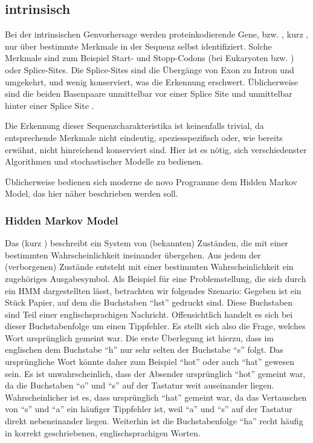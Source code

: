 \subsection{intrinsisch}
Bei der intrinsischen Genvorhersage werden proteinkodierende Gene, bzw.
, kurz , nur über bestimmte Merkmale in
der Sequenz selbst identifiziert.
Solche Merkmale sind zum Beispiel Start- und Stopp-Codons (bei
Eukaryoten  bzw. ) oder Splice-Sites.
Die Splice-Sites sind die Übergänge von Exon zu Intron und umgekehrt, und wenig
konserviert, was die Erkennung erschwert.
Üblicherweise sind die beiden Basenpaare unmittelbar vor einer
Splice Site  und unmittelbar hinter einer Splice Site .

Die Erkennung dieser Sequenzcharakteristika ist keinenfalls trivial, da entsprechende
Merkmale nicht eindeutig, speziesspezifisch oder, wie bereits erwähnt, nicht
hinreichend konserviert sind.
Hier ist es nötig, sich verschiedenster Algorithmen und stochastischer
Modelle zu bedienen.

Üblicherweise bedienen sich moderne de novo  Programme dem Hidden
Markov Model, das hier näher beschrieben werden soll.

\subsubsection{Hidden Markov Model}
Das  (kurz )
beschreibt ein System von (bekannten) Zuständen, die mit einer bestimmten
Wahrscheinlichkeit ineinander übergehen.
Aus jedem der (verborgenen) Zustände entsteht mit einer
bestimmten Wahrscheinlichkeit ein zugehöriges Ausgabesymbol.
Als Beispiel für eine Problemstellung, die sich durch ein HMM dargestellten
lässt, betrachten wir folgendes Szenario:
Gegeben ist ein Stück Papier, auf dem die Buchstaben \enquote{hst}
gedruckt sind.
Diese Buchstaben sind Teil einer englischsprachigen Nachricht.
Offensichtlich handelt es sich bei dieser Buchstabenfolge um einen Tippfehler.
Es stellt sich also die Frage, welches Wort ursprünglich gemeint war.
Die erste Überlegung ist hierzu, dass im englischen dem Buchstabe \enquote{h}
nur sehr selten der Buchstabe \enquote{s} folgt.
Das ursprüngliche Wort könnte daher zum Beispiel \enquote{hot} oder auch
\enquote{hat} gewesen sein.
Es ist unwahrscheinlich, dass der Absender ursprünglich \enquote{hot} gemeint
war, da die Buchstaben \enquote{o} und \enquote{s} auf der Tastatur weit
auseinander liegen.
Wahrscheinlicher ist es, dass ursprünglich \enquote{hat} gemeint war, da das
Vertauschen von \enquote{s} und \enquote{a} ein häufiger Tippfehler ist, weil
\enquote{a} und \enquote{s} auf der Tastatur direkt nebeneinander liegen.
Weiterhin ist die Buchstabenfolge \enquote{ha} recht häufig in korrekt
geschriebenen, englischsprachigen Worten.

